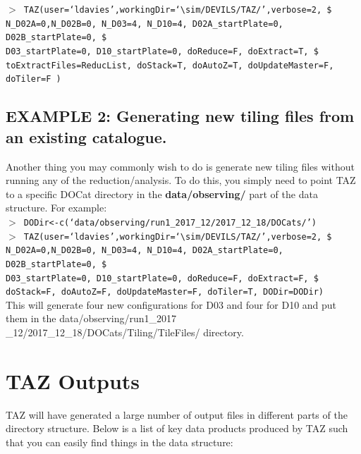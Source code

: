 \documentclass[12pt]{article}
\begin{document}
 \hspace{10mm} \texttt{$>$ TAZ(user=`ldavies',workingDir=`$\sim$/DEVILS/TAZ/',verbose=2, \$ \\
N\_D02A=0,N\_D02B=0, N\_D03=4, N\_D10=4, D02A\_startPlate=0, D02B\_startPlate=0, \$ \\ 
D03\_startPlate=0, D10\_startPlate=0,  doReduce=F, doExtract=T,   \$ \\
toExtractFiles=ReducList, doStack=T,  doAutoZ=T, doUpdateMaster=F, doTiler=F ) }\\  
 

\subsection{EXAMPLE 2: Generating new tiling files from an existing catalogue.}

Another thing you may commonly wish to do is generate new tiling files without running any of the reduction/analysis. To do this, you simply need to point TAZ to a specific DOCat directory in the \textbf{data/observing/} part of the data structure. For example:\\

 \hspace{10mm} \texttt{$>$ DODir<-c(`data/observing/run1\_2017\_12/2017\_12\_18/DOCats/')}\\

 \hspace{10mm} \texttt{$>$ TAZ(user=`ldavies',workingDir=`$\sim$/DEVILS/TAZ/',verbose=2, \$ \\
N\_D02A=0,N\_D02B=0, N\_D03=4, N\_D10=4, D02A\_startPlate=0, D02B\_startPlate=0, \$ \\ 
D03\_startPlate=0, D10\_startPlate=0,  doReduce=F, doExtract=F,   \$ \\
 doStack=F,  doAutoZ=F, doUpdateMaster=F, doTiler=T, DODir=DODir) }\\  

This will generate four new configurations for D03 and four for D10 and put them in the data/observing/run1\_2017 \_12/2017\_12\_18/DOCats/Tiling/TileFiles/ directory. 


\section{TAZ Outputs}

TAZ will have generated a large number of output files in different parts of the directory structure. Below is a list of key data products produced by TAZ such that you can easily find things in the data structure: 
\end{document}
